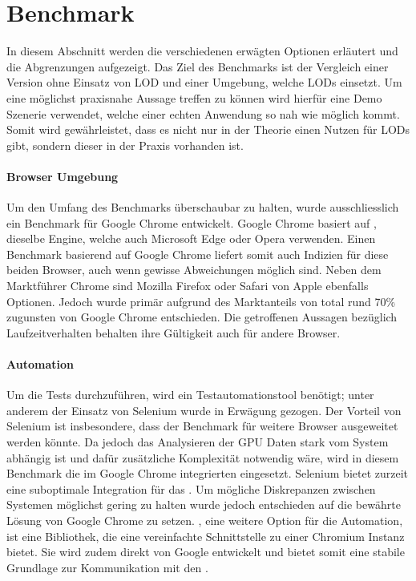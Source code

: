 \section{Benchmark}

In diesem Abschnitt werden die verschiedenen erwägten Optionen erläutert und die Abgrenzungen aufgezeigt.
Das Ziel des Benchmarks ist der Vergleich einer Version ohne Einsatz von LOD und einer Umgebung, welche LODs einsetzt. Um eine möglichst praxisnahe Aussage treffen zu können wird hierfür eine Demo Szenerie verwendet, welche einer echten Anwendung so nah wie möglich kommt. Somit wird gewährleistet, dass es nicht nur in der Theorie einen Nutzen für LODs gibt, sondern dieser in der Praxis vorhanden ist.

\paragraph{Browser Umgebung}
Um den Umfang des Benchmarks überschaubar zu halten, wurde ausschliesslich ein Benchmark für Google Chrome entwickelt.
Google Chrome basiert auf , dieselbe Engine, welche auch Microsoft Edge oder Opera verwenden.
Einen Benchmark basierend auf Google Chrome liefert somit auch Indizien für diese beiden Browser, auch wenn gewisse Abweichungen möglich sind.
Neben dem Marktführer Chrome sind Mozilla Firefox oder Safari von Apple ebenfalls Optionen. Jedoch wurde primär aufgrund des Marktanteils von total rund 70\% \cite{browserUsage} zugunsten von Google Chrome entschieden.
Die getroffenen Aussagen bezüglich Laufzeitverhalten behalten ihre Gültigkeit auch für andere Browser.

\paragraph{Automation}
Um die Tests durchzuführen, wird ein Testautomationstool benötigt; unter anderem der Einsatz von Selenium wurde in Erwägung gezogen.
Der Vorteil von Selenium ist insbesondere, dass der Benchmark für weitere Browser ausgeweitet werden könnte.
Da jedoch das Analysieren der GPU Daten stark vom System abhängig ist und dafür zusätzliche Komplexität notwendig wäre, wird in diesem Benchmark die im Google Chrome integrierten  eingesetzt.
Selenium bietet zurzeit eine suboptimale Integration für das .
Um mögliche Diskrepanzen zwischen Systemen möglichst gering zu halten wurde jedoch entschieden auf die bewährte Lösung von Google Chrome zu setzen.
, eine weitere Option für die Automation, ist eine Bibliothek, die eine vereinfachte Schnittstelle zu einer Chromium Instanz bietet.
Sie wird zudem direkt von Google entwickelt und bietet somit eine stabile Grundlage zur Kommunikation mit den .

